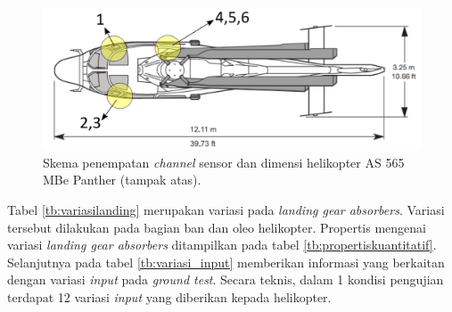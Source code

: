 \begin{figure}[H]
	\centering
	\includegraphics[width=0.75\linewidth]{gambar/tampak_atas.png}
	\caption{Skema penempatan \textit{channel} sensor dan dimensi helikopter AS 565 MBe Panther (tampak atas).}
	\label{tampak_atas.png}
\end{figure}

Tabel \ref{tb:variasilanding} merupakan variasi pada \textit{landing gear absorbers}. Variasi tersebut dilakukan pada bagian ban dan oleo helikopter. Propertis mengenai variasi \textit{landing gear absorbers} ditampilkan pada tabel \ref{tb:propertiskuantitatif}. Selanjutnya pada tabel \ref{tb:variasi_input} memberikan informasi yang berkaitan dengan variasi \textit{input} pada \textit{ground test}. Secara teknis, dalam 1 kondisi pengujian terdapat 12 variasi \textit{input} yang diberikan kepada helikopter.


